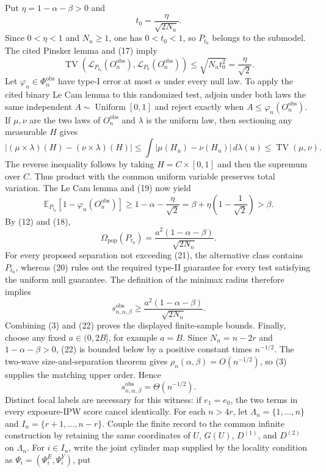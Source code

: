Put \(\eta=1-\alpha-\beta>0\) and
\[
 t_0=\frac{\eta}{\sqrt{2N_n}}. \tag{18}
\]
Since \(0<\eta<1\) and \(N_n\ge1\), one has \(0<t_0<1\), so \(P_{t_0}\) belongs to the submodel.  The cited Pinsker lemma and (17) imply
\[
 \operatorname{TV}\!\left(
  \mathcal L_{P_{t_0}}(O_n^{\mathrm{obs}}),
  \mathcal L_{P_0}(O_n^{\mathrm{obs}})
 \right)
 \le\sqrt{N_nt_0^2}
 =\frac{\eta}{\sqrt2}. \tag{19}
\]
Let \(\varphi_n\in\Phi_n^{\mathrm{obs}}\) have type-I error at most \(\alpha\) under every null law.  To apply the cited binary Le Cam lemma to this randomized test, adjoin under both laws the same independent \(A\sim\operatorname{Uniform}[0,1]\) and reject exactly when \(A\le\varphi_n(O_n^{\mathrm{obs}})\).  If \(\mu,\nu\) are the two laws of \(O_n^{\mathrm{obs}}\) and \(\lambda\) is the uniform law, then sectioning any measurable \(H\) gives
\[
 |(\mu\times\lambda)(H)-(\nu\times\lambda)(H)|
 \le\int|\mu(H_u)-\nu(H_u)|\,d\lambda(u)
 \le\operatorname{TV}(\mu,\nu).
\]
The reverse inequality follows by taking \(H=C\times[0,1]\) and then the supremum over \(C\).  Thus product with the common uniform variable preserves total variation.  The Le Cam lemma and (19) now yield
\[
 \mathbb E_{P_{t_0}}[1-\varphi_n(O_n^{\mathrm{obs}})]
 \ge1-\alpha-\frac{\eta}{\sqrt2}
 =\beta+\eta\left(1-\frac1{\sqrt2}\right)
 >\beta. \tag{20}
\]
By (12) and (18),
\[
 \Omega_{\mathrm{pop}}(P_{t_0})
 =\frac{a^2(1-\alpha-\beta)}{\sqrt{2N_n}}. \tag{21}
\]
For every proposed separation not exceeding (21), the alternative class contains \(P_{t_0}\), whereas (20) rules out the required type-II guarantee for every test satisfying the uniform null guarantee.  The definition of the minimax radius therefore implies
\[
 s_{n,\alpha,\beta}^{\mathrm{obs}}
 \ge\frac{a^2(1-\alpha-\beta)}{\sqrt{2N_n}}. \tag{22}
\]
Combining (3) and (22) proves the displayed finite-sample bounds.  Finally, choose any fixed \(a\in(0,2B]\), for example \(a=B\).  Since \(N_n=n-2r\) and \(1-\alpha-\beta>0\), (22) is bounded below by a positive constant times \(n^{-1/2}\).  The two-wave size-and-separation theorem gives \(\rho_n(\alpha,\beta)=O(n^{-1/2})\), so (3) supplies the matching upper order.  Hence
\[
 s_{n,\alpha,\beta}^{\mathrm{obs}}=\Theta(n^{-1/2}).
\]
Distinct focal labels are necessary for this witness: if \(e_1=e_0\), the two terms in every exposure-IPW score cancel identically.
For each \(n>4r\), let \(\Lambda_n=\{1,\ldots,n\}\) and \(I_n=\{r+1,\ldots,n-r\}\).  Couple the finite record to the common infinite construction by retaining the same coordinates of \(U\), \(G(U)\), \(D^{(1)}\), and \(D^{(2)}\) on \(\Lambda_n\).  For \(i\in I_n\), write the joint cylinder map supplied by the locality condition as \(\Psi_i=(\Psi_i^E,\Psi_i^Y)\), put
